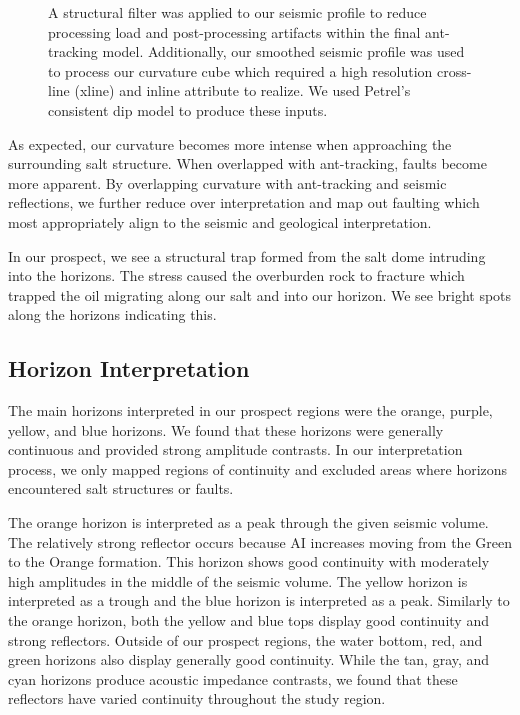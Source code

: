\documentclass[fleqn]{article}
\begin{document}
\begin{figure}[H]
    \begin{minipage}[b]{\textwidth}
        \centering
        
        \caption{A structural filter was applied to our seismic profile to reduce processing load and post-processing artifacts within the final ant-tracking model. Additionally, our smoothed seismic profile was used to process our curvature cube which required a high resolution cross-line (xline) and inline attribute to realize. We used Petrel's consistent dip model to produce these inputs.}
        \label{fig:Curvature_Flowchart}
    \end{minipage}
\end{figure}

As expected, our curvature becomes more intense when approaching the surrounding salt structure. When overlapped with ant-tracking, faults become more apparent. By overlapping curvature with ant-tracking and seismic reflections, we further reduce over interpretation and map out faulting which most appropriately align to the seismic and geological interpretation.

In our prospect, we see a structural trap formed from the salt dome intruding into the horizons. The stress caused the overburden rock to fracture which trapped the oil migrating along our salt and into our horizon. We see bright spots along the horizons indicating this.

\subsection{Horizon Interpretation}

The main horizons interpreted in our prospect regions were the orange, purple, yellow, and blue horizons. We found that these horizons were generally continuous and provided strong amplitude contrasts. In our interpretation process, we only mapped regions of continuity and excluded areas where horizons encountered salt structures or faults.

The orange horizon is interpreted as a peak through the given seismic volume. The relatively strong reflector occurs because AI increases moving from the Green to the Orange formation. This horizon shows good continuity with moderately high amplitudes in the middle of the seismic volume. The yellow horizon is interpreted as a trough and the blue horizon is interpreted as a peak. Similarly to the orange horizon, both the yellow and blue tops display good continuity and strong reflectors. Outside of our prospect regions, the water bottom, red, and green horizons also display generally good continuity. While the tan, gray, and cyan horizons produce acoustic impedance contrasts, we found that these reflectors have varied continuity throughout the study region. 
\end{document}
